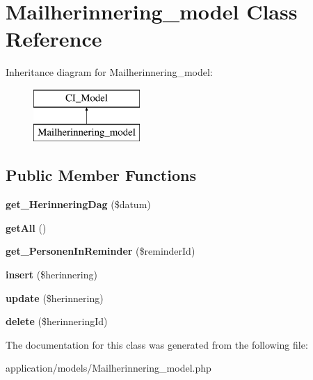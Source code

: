 \hypertarget{class_mailherinnering__model}{}\section{Mailherinnering\+\_\+model Class Reference}
\label{class_mailherinnering__model}
Inheritance diagram for Mailherinnering\+\_\+model\+:\begin{figure}[H]
\begin{center}
\leavevmode
\includegraphics[height=2.000000cm]{class_mailherinnering__model}
\end{center}
\end{figure}
\subsection*{Public Member Functions}
\begin{DoxyCompactItemize}
\item 
\mbox{\label{class_mailherinnering__model_a422d531c661ec9d18803bc7c9ec95a82}} 
{\bfseries get\+\_\+\+Herinnering\+Dag} (\$datum)
\item 
\mbox{\label{class_mailherinnering__model_a52d132c8b5bed589d41796c2bccaeea0}} 
{\bfseries get\+All} ()
\item 
\mbox{\label{class_mailherinnering__model_ae3c0049788b3d538c73c2b6f78fff595}} 
{\bfseries get\+\_\+\+Personen\+In\+Reminder} (\$reminder\+Id)
\item 
\mbox{\label{class_mailherinnering__model_a1e936efd2fa8e6e311a0289dacec6243}} 
{\bfseries insert} (\$herinnering)
\item 
\mbox{\label{class_mailherinnering__model_abcd691276b2a166a51c20bd1507acf9e}} 
{\bfseries update} (\$herinnering)
\item 
\mbox{\label{class_mailherinnering__model_a6c3374952042cc2f90cdbb27cc1bb07d}} 
{\bfseries delete} (\$herinnering\+Id)
\end{DoxyCompactItemize}


The documentation for this class was generated from the following file\+:\begin{DoxyCompactItemize}
\item 
application/models/Mailherinnering\+\_\+model.\+php\end{DoxyCompactItemize}
